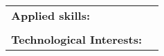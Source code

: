 \begin{cventries}
	\cventry
	{}
	{}
	{}
	{}
	{\def\arraystretch{1.15}{\begin{tabular}{ l l }
		\textbf{Applied skills:}  & {\skill{\hspace{1cm} Public Speaking, Community Management, Product Management, Mobile App Development }} \\ \\
		\textbf{Technological Interests:}  & {\skill{\hspace{1cm} JavaScript (React Native, Redux), Python, npm, Firebase, CI, ESLint, heroku etc.}}
		\end{tabular}}}
\end{cventries}

